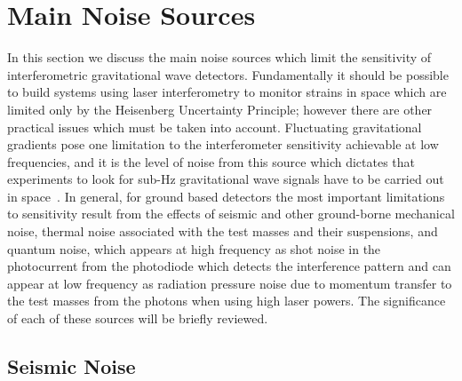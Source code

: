 \documentclass{article}
\begin{document}

\newpage

\section{Main Noise Sources}
\label{section:noise}

In this section we discuss the main noise sources which limit the
sensitivity of interferometric gravitational wave
detectors. Fundamentally it should be possible to build systems using
laser interferometry to monitor strains in space which are limited
only by the Heisenberg Uncertainty Principle; however there are other
practical issues which must be taken into account. Fluctuating
gravitational gradients pose one limitation to the interferometer
sensitivity achievable at low frequencies, and it is the level of
noise from this source which dictates that experiments to look for
sub-Hz gravitational wave signals have to be carried out in
space~\cite{Spero, Saulson1, Beccaria, Hughes}. In general, for ground
based detectors the most important limitations to sensitivity result
from the effects of seismic and other ground-borne mechanical noise,
thermal noise associated with the test masses and their suspensions,
and quantum noise, which appears at high frequency as shot noise in the photocurrent from the photodiode which detects
the interference pattern and can appear at low frequency as radiation pressure noise due to momentum transfer to the test masses from the photons when using high laser powers. The significance of each of these sources will be briefly reviewed.


\subsection{Seismic Noise}
\label{subsection:seismic}
\end{document}
